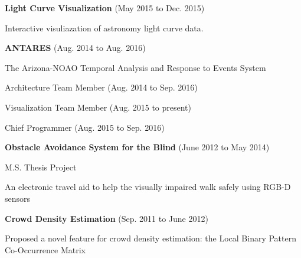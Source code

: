 \documentclass[10pt]{article}
\newcommand{\halfblankline}{\quad\vspace{-0.5\baselineskip}\pagebreak[3]}
\begin{document}
\textbf{Light Curve Visualization} (May 2015 to Dec. 2015)
\begin{innerlist}
\item Interactive visuliazation of astronomy light curve data.
\end{innerlist}

\halfblankline

\textbf{ANTARES} (Aug. 2014 to Aug. 2016)
\begin{innerlist}
\item The Arizona-NOAO Temporal Analysis and Response to Events System
\item Architecture Team Member (Aug. 2014 to Sep. 2016)
\item Visualization Team Member (Aug. 2015 to present)
\item Chief Programmer (Aug. 2015 to Sep. 2016)
\end{innerlist}

\halfblankline

\textbf{Obstacle Avoidance System for the Blind} (June 2012 to May 2014)
\begin{innerlist}
\item M.S. Thesis Project
\item An electronic travel aid to help the visually impaired walk safely using RGB-D sensors
\end{innerlist}

\halfblankline



\textbf{Crowd Density Estimation} (Sep. 2011 to June 2012)
\begin{innerlist}
\item Proposed a novel feature for crowd density estimation: the Local Binary Pattern Co-Occurrence Matrix
\end{innerlist}


\end{document}
